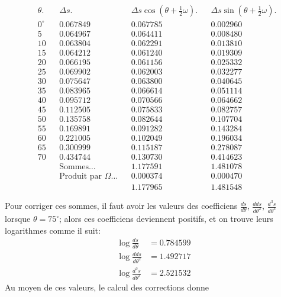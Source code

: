 \documentclass{article}
\begin{document}
\[ \begin{aligned} &\theta. && \Delta s. && \Delta s\cos(\theta+\tfrac{1}{2}\omega). && \Delta s\sin(\theta+\tfrac{1}{2}\omega).\\ &0^{\circ} && 0.067849 && 0.067785 && 0.002960\\ &5 && 0.064967 && 0.064411 && 0.008480\\ &10 && 0.063804 && 0.062291 && 0.013810\\ &15 && 0.064212 && 0.061240 && 0.019309\\ &20 && 0.066195 && 0.061156 && 0.025332\\ &25 && 0.069902 && 0.062003 && 0.032277\\ &30 && 0.075647 && 0.063800 && 0.040645\\ &35 && 0.083965 && 0.066614 && 0.051114\\ &40 && 0.095712 && 0.070566 && 0.064662\\ &45 && 0.112505 && 0.075833 && 0.082757\\ &50 && 0.135758 && 0.082644 && 0.107704\\ &55 && 0.169891 && 0.091282 && 0.143284\\ &60 && 0.221005 && 0.102049 && 0.196034\\ &65 && 0.300999 && 0.115187 && 0.278087\\ &70 && 0.434744 && 0.130730 && 0.414623\\ & && \text{Sommes}\ldots && 1.177591 && 1.481078\\ & && \text{Produit par }\Omega\ldots && 0.000374 && 0.000470\\ & && && 1.177965 && 1.481548 \end{aligned} \]

Pour corriger ces sommes, il faut avoir les valeurs des coefficiens $\frac{ds}{d\theta}$, $\frac{dds}{d\theta^{2}}$, $\frac{d^{3}s}{d\theta^{3}}$ lorsque $\theta=75^{\circ}$; alors ces coefficiens deviennent positifs, et on trouve leurs logarithmes comme il suit:
\[ \begin{aligned} \log\frac{ds}{d\theta}&=0.784599\\ \log\frac{dds}{d\theta^{2}}&=1.492717\\ \log\frac{d^{3}s}{d\theta^{3}}&=2.521532 \end{aligned} \]
Au moyen de ces valeurs, le calcul des corrections donne
\end{document}
